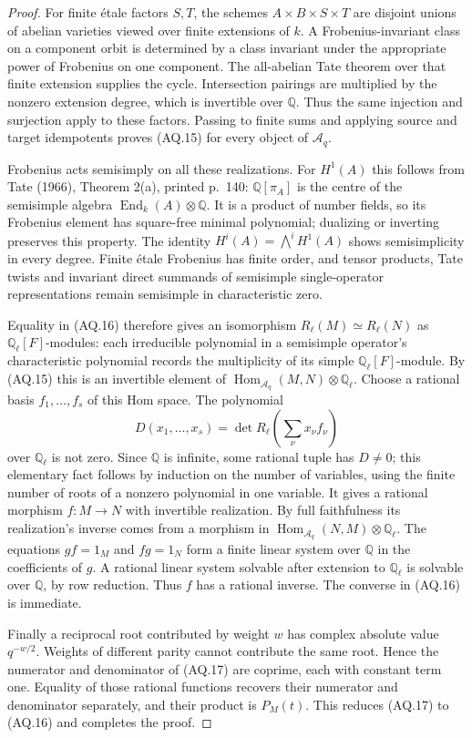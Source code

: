 \documentclass[11pt,a4paper]{article}
\theoremstyle{definition}\newtheorem{definition}[theorem]{Definition}
\theoremstyle{remark}\newtheorem{remark}[theorem]{Remark}
\begin{document}
\begin{proof}
For finite \'etale factors $S,T$, the schemes
$A\times B\times S\times T$ are disjoint unions
of abelian varieties viewed over finite extensions
of $k$. A Frobenius-invariant class on a component
orbit is determined by a class invariant under the
appropriate power of Frobenius on one component.
The all-abelian Tate theorem over that finite
extension supplies the cycle. Intersection pairings
are multiplied by the nonzero extension degree,
which is invertible over $\mathbb Q$. Thus the
same injection and surjection apply to these
factors. Passing to finite sums and applying
source and target idempotents proves (AQ.15)
for every object of $\mathcal A_q$.

Frobenius acts semisimply on all these realizations.
For $H^1(A)$ this follows from Tate (1966),
Theorem 2(a), printed p.~140: $\mathbb Q[\pi_A]$
is the centre of the semisimple algebra
$\operatorname{End}_k(A)\otimes\mathbb Q$.
It is a product of number fields, so its Frobenius
element has square-free minimal polynomial;
dualizing or inverting preserves this property.
The identity $H^i(A)=\bigwedge^i H^1(A)$ shows
semisimplicity in every degree. Finite \'etale
Frobenius has finite order, and tensor products,
Tate twists and invariant direct summands of
semisimple single-operator representations remain
semisimple in characteristic zero.

Equality in (AQ.16) therefore gives an isomorphism
$R_\ell(M)\simeq R_\ell(N)$ as
$\mathbb Q_\ell[F]$-modules: each irreducible
polynomial in a semisimple operator's characteristic
polynomial records the multiplicity of its simple
$\mathbb Q_\ell[F]$-module. By (AQ.15) this is
an invertible element of
$\operatorname{Hom}_{\mathcal A_q}(M,N)\otimes\mathbb Q_\ell$.
Choose a rational basis $f_1,\ldots,f_s$ of this
Hom space. The polynomial
\[
 D(x_1,\ldots,x_s)=
 \det R_\ell\!\left(\sum_\nu x_\nu f_\nu\right)
\]
over $\mathbb Q_\ell$ is not zero. Since
$\mathbb Q$ is infinite, some rational tuple
has $D\ne0$; this elementary fact follows by
induction on the number of variables, using the
finite number of roots of a nonzero polynomial
in one variable. It gives a rational morphism
$f:M\to N$ with invertible realization.
By full faithfulness its realization's inverse
comes from a morphism in
$\operatorname{Hom}_{\mathcal A_q}(N,M)\otimes\mathbb Q_\ell$.
The equations $gf=1_M$ and $fg=1_N$ form a
finite linear system over $\mathbb Q$ in the
coefficients of $g$. A rational linear system
solvable after extension to $\mathbb Q_\ell$
is solvable over $\mathbb Q$, by row reduction.
Thus $f$ has a rational inverse. The converse
in (AQ.16) is immediate.

Finally a reciprocal root contributed by weight
$w$ has complex absolute value $q^{-w/2}$.
Weights of different parity cannot contribute
the same root. Hence the numerator and denominator
of (AQ.17) are coprime, each with constant term
one. Equality of those rational functions
recovers their numerator and denominator separately,
and their product is $P_M(t)$. This reduces
(AQ.17) to (AQ.16) and completes the proof.
\end{proof}
\end{document}

